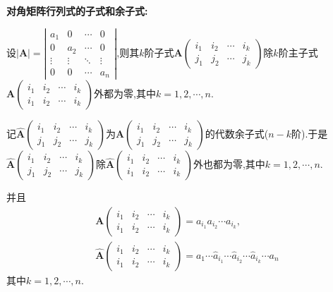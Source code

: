 \documentclass[../../main.tex]{subfiles}
\begin{document}
\begin{conclusion}\label{对角矩阵行列式的子式和余子式}
\hypertarget{对角矩阵行列式的子式和余子式}{\textbf{对角矩阵行列式的子式和余子式:}}

设\(|\boldsymbol{A}|=\left|\begin{matrix}
a_1 & 0 & \cdots & 0\\
0 & a_2 & \cdots & 0\\
\vdots & \vdots & \ddots & \vdots\\
0 & 0 & \cdots & a_n
\end{matrix}\right|\),则其\(k\)阶子式\(\boldsymbol{A}\left(\begin{matrix}
i_1 & i_2 & \cdots & i_k\\
j_1 & j_2 & \cdots & j_k
\end{matrix}\right)\)除\(k\)阶主子式\(\boldsymbol{A}\left(\begin{matrix}
i_1 & i_2 & \cdots & i_k\\
i_1 & i_2 & \cdots & i_k
\end{matrix}\right)\)外都为零,其中\(k = 1,2,\cdots,n\).

记\(\widehat{\boldsymbol{A}}\left(\begin{matrix}
i_1 & i_2 & \cdots & i_k\\
j_1 & j_2 & \cdots & j_k
\end{matrix}\right)\)为\(\boldsymbol{A}\left(\begin{matrix}
i_1 & i_2 & \cdots & i_k\\
j_1 & j_2 & \cdots & j_k
\end{matrix}\right)\)的代数余子式(\(n - k\)阶).于是\(\widehat{\boldsymbol{A}}\left(\begin{matrix}
i_1 & i_2 & \cdots & i_k\\
j_1 & j_2 & \cdots & j_k
\end{matrix}\right)\)除\(\widehat{\boldsymbol{A}}\left(\begin{matrix}
i_1 & i_2 & \cdots & i_k\\
i_1 & i_2 & \cdots & i_k
\end{matrix}\right)\)外也都为零,其中\(k = 1,2,\cdots,n\).

并且
\begin{align*}
&\boldsymbol{A}\left(\begin{matrix}
i_1 & i_2 & \cdots & i_k\\
i_1 & i_2 & \cdots & i_k
\end{matrix}\right) = a_{i_1}a_{i_2}\cdots a_{i_k},
\\
&\widehat{\boldsymbol{A}}\left(\begin{matrix}
i_1 & i_2 & \cdots & i_k\\
i_1 & i_2 & \cdots & i_k
\end{matrix}\right) = a_1\cdots \hat{a}_{i_1}\cdots \hat{a}_{i_2}\cdots \hat{a}_{i_k}\cdots a_n\,
\end{align*}
其中\(k = 1,2,\cdots,n\).
\end{conclusion}
\end{document}
